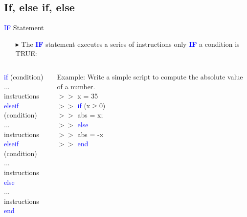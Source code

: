 \documentclass[xcolor={dvipsnames,rgb}, aspectratio=169]{beamer}
\begin{document}
\subsection{If, else if, else}
\begin{frame}{\textcolor{blue}{IF} Statement}
\begin{itemize}
   \item[$\blacktriangleright$] The \textcolor{blue}{\textbf{IF}} statement executes a
      series of instructions only \textcolor{blue}{\textbf{IF}} a condition is TRUE:
\end{itemize}

\begin{columns}
   \begin{tcolorbox}[colback=white,colframe=bluepoli]
      \textcolor{blue}{if} (condition)\\
      ... instructions\\
      \textcolor{blue}{elseif} (condition)\\
      ... instructions \\
      \textcolor{blue}{elseif} (condition)\\
      ... instructions \\
      \textcolor{blue}{else}\\
      ... instructions \\
      \textcolor{blue}{end}
   \end{tcolorbox}
   \begin{tcolorbox}[colback=white,colframe=bluepoli]
      \textcolor{mylilas}{Example: Write a simple script to compute the absolute value of
      a number.}\\
      $>>$ x = 35\\
      $>>$ \textcolor{blue}{if} (x$\ge$0)\\
      $>>$ \hspace{1em}abs = x;\\
      $>>$ \textcolor{blue}{else}\\
      $>>$ \hspace{1em}abs = -x\\
      $>>$ \textcolor{blue}{end}
   \end{tcolorbox}
\end{columns}
\end{frame}
\end{document}
